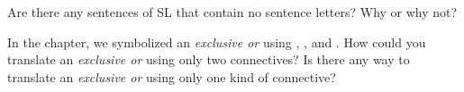 \begin{earg}


\end{earg}




\problempart
\begin{earg}
\item Are there any sentences of SL that contain no sentence letters? Why or why not? %
\item In the chapter, we symbolized an \emph{exclusive or} using \eor, \eand, and \enot. How could you translate an \emph{exclusive or} using only two connectives? Is there any way to translate an \emph{exclusive or} using only one kind of connective? %
\end{earg}






